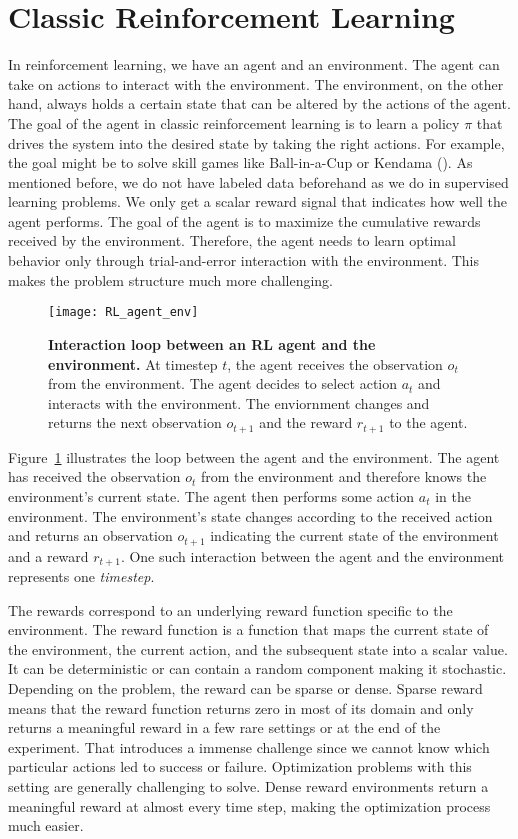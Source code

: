 

\section{Classic Reinforcement Learning}
In reinforcement learning, we have an agent and an environment. The agent can take on actions to interact with the environment. The environment, on the other hand, always holds a certain state that can be altered by the actions of the agent. The goal of the agent in classic reinforcement learning is to learn a policy $\pi$ that drives the system into the desired state by taking the right actions. For example, the goal might be to solve skill games like Ball-in-a-Cup or Kendama (\cite{kober2010imitation}). As mentioned before, we do not have labeled data beforehand as we do in supervised learning problems. We only get a scalar reward signal that indicates how well the agent performs. The goal of the agent is to maximize the cumulative rewards received by the environment. Therefore, the agent needs to learn optimal behavior only through trial-and-error interaction with the environment. This makes the problem structure much more challenging.
\begin{figure}[!ht]
\centering
\texttt{[image: RL\_agent\_env]}
\caption[Interaction loop between an RL agent and the environment]{
  \textbf{Interaction loop between an RL agent and the environment.}
  At timestep $t$, the agent receives the observation $o_t$ from the environment. The agent decides to select action $a_t$ and interacts with the environment. The enviornment changes and returns the next observation $o_{t+1}$ and the reward $r_{t+1}$ to the agent.
}
\label{fig:RL_agent_env}
\end{figure}
Figure~\ref{fig:RL_agent_env} illustrates the loop between the agent and the environment. The agent has received the observation $o_t$ from the environment and therefore knows the environment's current state. The agent then performs some action $a_t$ in the environment. The environment's state changes according to the received action and returns an observation $o_{t+1}$ indicating the current state of the environment and a reward $r_{t+1}$. One such interaction between the agent and the environment represents one \emph{timestep}.

The rewards correspond to an underlying reward function specific to the environment. The reward function is a function that maps the current state of the environment, the current action, and the subsequent state into a scalar value. It can be deterministic or can contain a random component making it stochastic. Depending on the problem, the reward can be sparse or dense. Sparse reward means that the reward function returns zero in most of its domain and only returns a meaningful reward in a few rare settings or at the end of the experiment. That introduces a immense challenge since we cannot know which particular actions led to success or failure. Optimization problems with this setting are generally challenging to solve. Dense reward environments return a meaningful reward at almost every time step, making the optimization process much easier.

